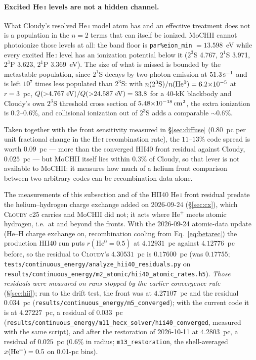 \documentclass[english,a4paper]{my_memo}
\newcommand{\code}[1]{\texttt{#1}}
\begin{document}
\paragraph{Excited He\,\textsc{i} levels are not a hidden channel.}  What
Cloudy's resolved He\,\textsc{i} model atom has and an effective treatment
does not is a population in the $n = 2$ terms that can itself be ionized.
MoCHII cannot photoionize those levels at all: the band floor is
\code{par\%eion\_min} $= 13.598$~eV while every excited He\,\textsc{i}
level has an ionization potential below it ($2^3$S 4.767, $2^1$S 3.971,
$2^3$P 3.623, $2^1$P 3.369~eV).  The size of what is missed is bounded by
the metastable population, since $2^1$S decays by two-photon emission at
$51.3\,{\rm s^{-1}}$ and is left $10^7$ times less populated than $2^3$S:
with $n(2^3{\rm S})/n({\rm He^0}) = 6.2{\times}10^{-5}$ at $r = 3$~pc,
$Q({>}4.767~{\rm eV})/Q({>}24.587~{\rm eV}) = 33.8$ for a 40-kK blackbody
and Cloudy's own $2^3$S threshold cross section of
$5.48{\times}10^{-18}\,{\rm cm^2}$, the extra ionization is
$0.2$--$0.6\%$, and collisional ionization out of $2^3$S adds a comparable
${\sim}0.6\%$.

Taken together with the front sensitivity measured in
\S\ref{sec:diffuse} ($0.80$~pc per unit fractional change in the
He\,\textsc{i} recombination rate), the $11$--$13\%$ code spread is worth
$0.09$~pc --- more than the converged HII40 front residual against Cloudy,
$0.025$~pc --- but MoCHII
itself lies within $0.3\%$ of Cloudy, so that lever is not available to
MoCHII: it measures how much of a helium front comparison between two
arbitrary codes can be recombination data alone.

The measurements of this subsection and of the HII40 He\,\textsc{i} front
residual predate the helium--hydrogen charge exchange added on 2026-09-24
(\S\ref{sec:cx}), which \textsc{Cloudy} c25 carries and MoCHII did not;
it acts where He$^+$ meets atomic hydrogen, i.e.\ at and beyond the fronts.
With the 2026-09-24 atomic-data update (He--H charge exchange on,
recombination cooling from Eq.~\ref{eq:betarec}) the production HII40 run
puts $r(\mathrm{He^0}=0.5)$ at $4.12931$~pc against $4.12776$~pc before,
so the residual to \textsc{Cloudy}'s $4.30531$~pc is $0.17600$~pc
(was $0.17755$; \code{tests/continuous\_energy/analyze\_hii40\_residuals.py}
on \code{results/continuous\_energy/m2\_atomic/hii40\_atomic\_rates.h5}).
\emph{Those residuals were measured on runs stopped by the earlier
convergence rule} (\S\ref{sec:hii}); run to the drift test, the front was at
$4.27107$~pc and the residual $0.034$~pc
(\code{results/continuous\_energy/m5\_converged}); with the current code it is
at $4.27227$~pc, a residual of $0.033$~pc
(\code{results/continuous\_energy/m11\_hecx\_solver/hii40\_converged},
measured with the same script), and after the restoration of 2026-10-11 at
$4.2803$~pc, a residual of $0.025$~pc ($0.6\%$ in radius;
\code{m13\_restoration}, the shell-averaged $x({\rm He^+}) = 0.5$ on
0.01-pc bins).
\end{document}
